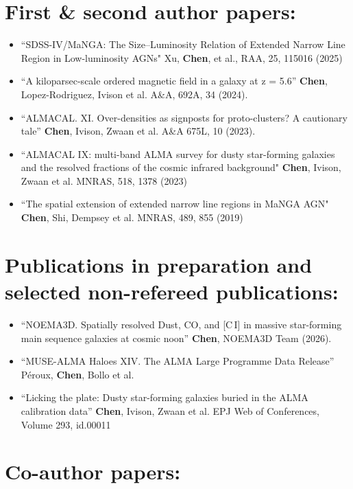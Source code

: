 \documentclass[A4,11pt]{article}
\newenvironment{paperlist}
{ \begin{itemize}[leftmargin=0.8cm, label={$\bullet$}]
    \setlength{\itemsep}{1pt}
    \setlength{\parskip}{1pt}
    \setlength{\parsep}{1pt}     }
{ \end{itemize}                  }
\begin{document}

\section{First \& second author papers:}
\begin{paperlist}
  \item ``SDSS-IV/MaNGA: The Size–Luminosity Relation of Extended Narrow Line Region in Low-luminosity AGNs" Xu, \textbf{Chen}, et al., RAA, 25, 115016 (2025)
  \item ``A kiloparsec-scale ordered magnetic field in a galaxy at z = 5.6'' \textbf{Chen}, Lopez-Rodriguez, Ivison et al. A\&A, 692A, 34 (2024).
  \item ``ALMACAL. XI. Over-densities as signposts for proto-clusters? A cautionary tale'' \textbf{Chen}, Ivison, Zwaan et al. A\&A 675L, 10 (2023). 
    \item ``ALMACAL IX: multi-band ALMA survey for dusty star-forming galaxies and the resolved fractions of the cosmic infrared background" \textbf{Chen}, Ivison, Zwaan et al. MNRAS, 518, 1378 (2023)
    \item ``The spatial extension of extended narrow line regions in MaNGA AGN" \textbf{Chen}, Shi, Dempsey et al. MNRAS, 489, 855 (2019)
\end{paperlist}

\section{Publications in preparation and selected non-refereed publications:}
\begin{paperlist}
    \item ``NOEMA3D. Spatially resolved Dust, CO, and [C\,I] in massive star-forming main sequence galaxies at cosmic noon'' \textbf{Chen}, NOEMA3D Team (2026). 
    \item ``MUSE-ALMA Haloes XIV. The ALMA Large Programme Data Release'' P\'eroux, \textbf{Chen}, Bollo et al.
    \item ``Licking the plate: Dusty star-forming galaxies buried in the ALMA calibration data'' \textbf{Chen},  Ivison, Zwaan et al. EPJ Web of Conferences, Volume 293, id.00011 
\end{paperlist}

\section{Co-author papers:}
\end{document}

